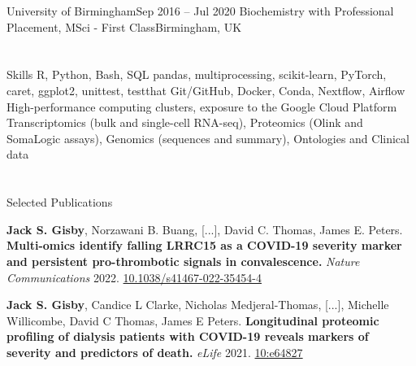     \resumeEntryTSDL
      {University of Birmingham}{Sep 2016 -- Jul 2020}
      {Biochemistry with Professional Placement, MSci - First Class}{Birmingham, UK}
  \resumeEntryEnd



\section{\faGears}{Skills}
 \resumeEntryStart
   {R, Python, Bash, SQL}
   {pandas, multiprocessing, scikit-learn, PyTorch, caret, ggplot2, unittest, testthat}
   {Git/GitHub, Docker, Conda, Nextflow, Airflow}  %
   {High-performance computing clusters, exposure to the Google Cloud Platform}
   {Transcriptomics (bulk and single-cell RNA-seq), Proteomics (Olink and SomaLogic assays), Genomics (sequences and summary), Ontologies and Clinical data}
 \resumeEntryEnd

\vspace{5pt}


\section{\faFlask}{Selected Publications}

\resumeEntryStart
    \item \textbf{Jack S. Gisby}\textsuperscript{\textdagger}, Norzawani B. Buang\textsuperscript{\textdagger}, [...], David C. Thomas\textsuperscript{\textdagger}, James E. Peters\textsuperscript{\textdagger}. \textbf{Multi-omics identify falling LRRC15 as a COVID-19 severity marker and persistent pro-thrombotic signals in convalescence.} \textit{Nature Communications} 2022. \href{https://doi.org/10.1038/s41467-022-35454-4}{10.1038/s41467-022-35454-4}
      
    \item \textbf{Jack S. Gisby}\textsuperscript{\textdagger}, Candice L Clarke\textsuperscript{\textdagger}, Nicholas Medjeral-Thomas\textsuperscript{\textdagger}, [...], Michelle Willicombe\textsuperscript{\textdagger}, David C Thomas\textsuperscript{\textdagger}, James E Peters\textsuperscript{\textdagger}. \textbf{Longitudinal proteomic profiling of dialysis patients with COVID-19 reveals markers of severity and predictors of death.} \textit{eLife} 2021. \href{https://doi.org/10.7554/eLife.64827}{10:e64827}
    
